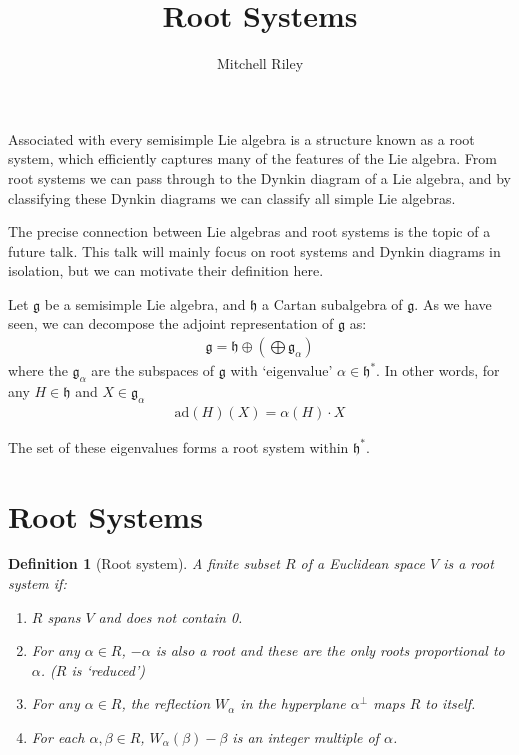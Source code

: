 \documentclass[10pt,a4paper]{article}
\author{Mitchell Riley}
\title{Root Systems}
\newtheorem{definition}[theorem]{Definition}
\begin{document}
\maketitle

Associated with every semisimple Lie algebra is a structure known as a root system, which efficiently captures many of the features of the Lie algebra. From root systems we can pass through to the Dynkin diagram of a Lie algebra, and by classifying these Dynkin diagrams we can classify all simple Lie algebras.

The precise connection between Lie algebras and root systems is the topic of a future talk. This talk will mainly focus on root systems and Dynkin diagrams in isolation, but we can motivate their definition here.

Let $\mathfrak{g}$ be a semisimple Lie algebra, and $\mathfrak{h}$ a Cartan subalgebra of $\mathfrak{g}$. As we have seen, we can decompose the adjoint representation of $\mathfrak{g}$ as:
\begin{align*}
	\mathfrak{g} = \mathfrak{h} \oplus \left(\bigoplus \mathfrak{g}_\alpha \right)
\end{align*}
where the $\mathfrak{g}_\alpha$ are the subspaces of $\mathfrak{g}$ with `eigenvalue' $\alpha \in \mathfrak{h}^*$. In other words, for any $H \in \mathfrak{h}$ and $X \in \mathfrak{g}_\alpha$
\begin{align*}
	\text{ad}(H)(X) = \alpha(H) \cdot X
\end{align*}

The set of these eigenvalues forms a root system within $\mathfrak{h}^*$.

\section{Root Systems}

\begin{definition}[Root system]

A finite subset $R$ of a Euclidean space $V$ is a root system if:

\begin{enumerate}
\item $R$ spans $V$ and does not contain 0.
\item For any $\alpha \in R$, $-\alpha$ is also a root and these are the only roots proportional to $\alpha$. ($R$ is `reduced')
\item For any $\alpha \in R$, the reflection $W_\alpha$ in the hyperplane $\alpha^\bot$ maps $R$ to itself.
\item For each $\alpha, \beta \in R$, $W_\alpha(\beta) - \beta$ is an integer multiple of $\alpha$.
\end{enumerate}
\end{definition}
\end{document}
